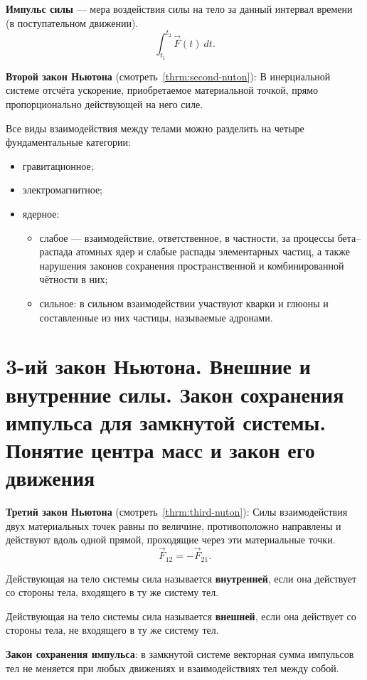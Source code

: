 \documentclass[10pt]{scrbook}
\begin{document}
\textbf{Импульс силы} --- мера воздействия силы на тело за данный интервал
времени (в поступательном движении). \[
	\int_{{t_1}}^{{t_2}} {\vec{F}(t)} \: d{t}
	.\]

\textbf{Второй закон Ньютона} (смотреть~\ref{thrm:second-nuton}): В
инерциальной системе отсчёта ускорение, приобретаемое материальной точкой,
прямо пропорционально действующей на него силе.

Все виды взаимодействия между телами можно разделить на четыре фундаментальные
категории:
\begin{itemize}
	\item гравитационное;
	\item электромагнитное;
	\item ядерное:
	      \begin{itemize}
		      \item слабое --- взаимодействие, ответственное, в частности, за
		            процессы бета--распада атомных ядер и слабые распады элементарных
		            частиц, а также нарушения законов сохранения пространственной и
		            комбинированной чётности в них;
		      \item сильное: в сильном взаимодействии участвуют кварки и глюоны и
		            составленные из них частицы, называемые адронами.
	      \end{itemize}
\end{itemize}

\section[третий вопрос]{3-ий закон Ньютона. Внешние и внутренние силы. Закон
  сохранения импульса для замкнутой системы. Понятие центра масс и закон его
  движения}

\textbf{Третий закон Ньютона} (смотреть~\ref{thrm:third-nuton}): Силы
взаимодействия двух материальных точек равны по величине, противоположно
направлены и действуют вдоль одной прямой, проходящие через эти материальные
точки. \[
	\vec{F}_{12} = -\vec{F}_{21}
	.\]

Действующая на тело системы сила называется \textbf{внутренней}, если она
действует со стороны тела, входящего в ту же систему тел.

Действующая на тело системы сила называется \textbf{внешней}, если она
действует со стороны тела, не входящего в ту же систему тел.

\textbf{Закон сохранения импульса}: в замкнутой системе векторная сумма
импульсов тел не меняется при любых движениях и взаимодействиях тел между
собой.
\end{document}
